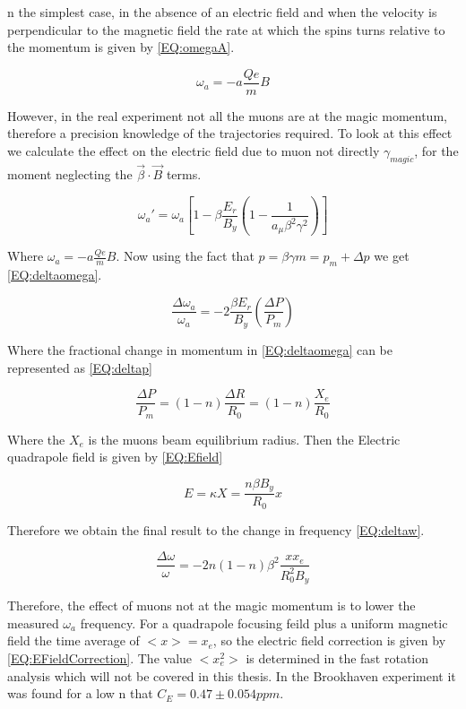 \documentclass[./Thesis]{subfiles}
\begin{document}
n the simplest case, in the absence of an electric field and when the velocity is perpendicular to the magnetic field the rate at which the spins turns relative to the momentum is given by \ref{EQ:omegaA}.
	
	\begin{equation}
	\label{EQ:omegaA}
	\omega_{a} = -a\frac{Qe}{m} B
	\end{equation}

However, in the real experiment not all the muons are at the magic momentum, therefore a precision knowledge of the trajectories required. To look at this effect we calculate the effect on the electric field due to muon not directly $\gamma_{magic}$, for the moment neglecting the $\vec{\beta}\cdot\vec{B}$ terms.

	\begin{equation}
	\omega_{a}' = \omega_{a}[1-\beta\frac{E_r}{B_y}(1-\frac{1}{a_\mu \beta^2 \gamma^2})]
	\end{equation}

Where $\omega_{a} = -a \frac{Qe}{m}B$. Now using the fact that $p=\beta\gamma m = p_m + \Delta p$ we get \ref{EQ:deltaomega}.


\begin{equation}
\label{EQ:deltaomega}
\frac{\Delta \omega_a}{\omega_a} = -2 \frac{\beta E_r}{B_y}(\frac{\Delta P}{P_m})
\end{equation}

Where the fractional change in momentum in \ref{EQ:deltaomega} can be represented as \ref{EQ:deltap}

\begin{equation}
\label{EQ:deltap}
\frac{\Delta P}{P_m}=(1-n)\frac{\Delta R}{R_0} = (1-n) \frac{X_e}{R_0}
\end{equation}

Where the $X_e$ is the muons beam equilibrium radius. Then the Electric quadrapole field is given by \ref{EQ:Efield}

\begin{equation}
\label{EQ:Efield}
E = \kappa X = \frac{n\beta B_y}{R_{0}}x
\end{equation}

Therefore we obtain the final result to the change in frequency \ref{EQ:deltaw}.

\begin{equation}
\label{EQ:deltaw}
\frac{\Delta \omega}{\omega} = -2n(1-n)\beta^2\frac{x x_e}{R_0^2 B_y}
\end{equation}

Therefore, the effect of muons not at the magic momentum is to lower the measured $\omega_a$ frequency. For a quadrapole focusing feild plus a uniform magnetic field the time average of $<x> = x_e$, so the electric field correction is given by \ref{EQ:EFieldCorrection}. The value $<x_e^2>$ is determined in the fast rotation analysis which will not be covered in this thesis. In the Brookhaven experiment it was found for a low n that $C_E = 0.47 \pm 0.054 ppm$.
\end{document}
